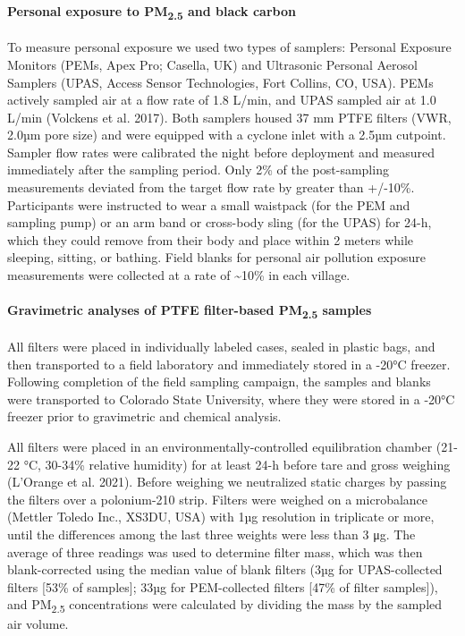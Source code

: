 \documentclass[
  letterpaper,
  DIV=11,
  numbers=noendperiod]{scrartcl}
\let\oldparagraph\paragraph
\renewcommand{\paragraph}[1]{\oldparagraph{#1}\mbox{}}
\begin{document}
\hypertarget{personal-exposure-to-pm2.5-and-black-carbon}{%
\paragraph{\texorpdfstring{Personal exposure to PM\textsubscript{2.5}
and black
carbon}{Personal exposure to PM2.5 and black carbon}}\label{personal-exposure-to-pm2.5-and-black-carbon}}

To measure personal exposure we used two types of samplers: Personal
Exposure Monitors (PEMs, Apex Pro; Casella, UK) and Ultrasonic Personal
Aerosol Samplers (UPAS, Access Sensor Technologies, Fort Collins, CO,
USA). PEMs actively sampled air at a flow rate of 1.8 L/min, and UPAS
sampled air at 1.0 L/min (Volckens et al. 2017). Both samplers housed 37
mm PTFE filters (VWR, 2.0µm pore size) and were equipped with a cyclone
inlet with a 2.5µm cutpoint. Sampler flow rates were calibrated the
night before deployment and measured immediately after the sampling
period. Only 2\% of the post-sampling measurements deviated from the
target flow rate by greater than +/-10\%. Participants were instructed
to wear a small waistpack (for the PEM and sampling pump) or an arm band
or cross-body sling (for the UPAS) for 24-h, which they could remove
from their body and place within 2 meters while sleeping, sitting, or
bathing. Field blanks for personal air pollution exposure measurements
were collected at a rate of \textasciitilde10\% in each village.

\hypertarget{gravimetric-analyses-of-ptfe-filter-based-pm2.5-samples}{%
\paragraph{\texorpdfstring{Gravimetric analyses of PTFE filter-based
PM\textsubscript{2.5}
samples}{Gravimetric analyses of PTFE filter-based PM2.5 samples}}\label{gravimetric-analyses-of-ptfe-filter-based-pm2.5-samples}}

All filters were placed in individually labeled cases, sealed in plastic
bags, and then transported to a field laboratory and immediately stored
in a -20°C freezer. Following completion of the field sampling campaign,
the samples and blanks were transported to Colorado State University,
where they were stored in a -20°C freezer prior to gravimetric and
chemical analysis.

All filters were placed in an environmentally-controlled equilibration
chamber (21-22 °C, 30-34\% relative humidity) for at least 24-h before
tare and gross weighing (L'Orange et al. 2021). Before weighing we
neutralized static charges by passing the filters over a polonium-210
strip. Filters were weighed on a microbalance (Mettler Toledo Inc.,
XS3DU, USA) with 1µg resolution in triplicate or more, until the
differences among the last three weights were less than 3 μg. The
average of three readings was used to determine filter mass, which was
then blank-corrected using the median value of blank filters (3µg for
UPAS-collected filters {[}53\% of samples{]}; 33µg for PEM-collected
filters {[}47\% of filter samples{]}), and PM\textsubscript{2.5}
concentrations were calculated by dividing the mass by the sampled air
volume.
\end{document}
